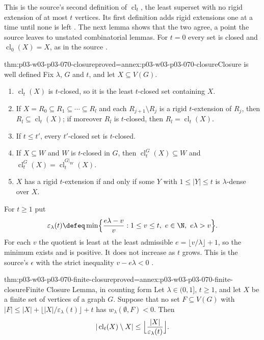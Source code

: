 This is the source's second definition of \(\operatorname{cl}_t\), the least
superset with no rigid extension of at most \(t\) vertices.  Its first
definition adds rigid extensions one at a time until none is left
\cite[p.~8]{Spencer2007LogicRandomStructuresAuthor}.  The next lemma shows
that the two agree, a point the source leaves to unstated combinatorial
lemmas.  For \(t=0\) every set is closed and \(\operatorname{cl}_0(X)=X\), as
in the source \cite[p.~9]{Spencer2007LogicRandomStructuresAuthor}.

\begin{hblemma}{thm:p03-w03-p03-070-closure}{proved=annex:p03-w03-p03-070-closure}{Closure is well defined}
Fix \(\lambda\), \(G\) and \(t\), and let \(X\subseteq V(G)\).
\begin{enumerate}
\item \(\operatorname{cl}_t(X)\) is \(t\)-closed, so it is the least
      \(t\)-closed set containing \(X\).
\item If \(X=R_0\subseteq R_1\subseteq\cdots\subseteq R_l\) and each
      \(R_{j+1}\setminus R_j\) is a rigid \(t\)-extension of \(R_j\), then
      \(R_l\subseteq\operatorname{cl}_t(X)\); if moreover \(R_l\) is
      \(t\)-closed, then \(R_l=\operatorname{cl}_t(X)\).
\item If \(t\leq t'\), every \(t'\)-closed set is \(t\)-closed.
\item If \(X\subseteq W\) and \(W\) is \(t\)-closed in \(G\), then
      \(\operatorname{cl}^G_t(X)\subseteq W\) and
      \(\operatorname{cl}^G_t(X)=\operatorname{cl}^{G|_W}_t(X)\).
\item \(X\) has a rigid \(t\)-extension if and only if some \(Y\) with
      \(1\leq|Y|\leq t\) is \(\lambda\)-dense over \(X\).
\end{enumerate}
\end{hblemma}

For \(t\geq1\) put
\[
  \varepsilon_\lambda(t)\defeq\min\Bigl\{\frac{e\lambda-v}{v}:
  1\leq v\leq t,\ e\in\N,\ e\lambda>v\Bigr\}.
\]
For each \(v\) the quotient is least at the least admissible
\(e=\lfloor v/\lambda\rfloor+1\), so the minimum exists and is positive.
It does not increase as \(t\) grows.  This is the source's \(\epsilon\) with
the strict inequality \(v-e\lambda<0\)
\cite[pp.~9 and 20]{Spencer2007LogicRandomStructuresAuthor}.

\begin{hblemma}{thm:p03-w03-p03-070-finite-closure}{proved=annex:p03-w03-p03-070-finite-closure}{Finite Closure Lemma, in counting form}
Let \(\lambda\in(0,1]\), \(t\geq1\), and let \(X\) be a finite set of
vertices of a graph \(G\).  Suppose that no set \(F\subseteq V(G)\) with
\(|F|\leq|X|+\lfloor|X|/\varepsilon_\lambda(t)\rfloor+t\) has
\(w_\lambda(\emptyset,F)<0\).  Then
\[
  |\operatorname{cl}_t(X)\setminus X|\leq\Bigl\lfloor\frac{|X|}{\varepsilon_\lambda(t)}\Bigr\rfloor .
\]
\end{hblemma}

